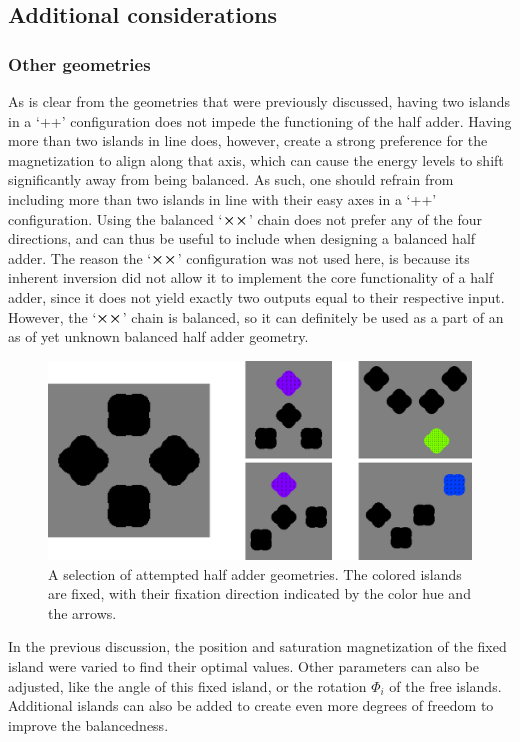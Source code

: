 \documentclass[11pt,a4paper,english,twoside]{article}
\begin{document}
\subsection{Additional considerations}
\subsubsection{Other geometries}
As is clear from the geometries that were previously discussed, having two islands in a `++' configuration does not impede the functioning of the half adder. Having more than two islands in line does, however, create a strong preference for the magnetization to align along that axis, which can cause the energy levels to shift significantly away from being balanced. As such, one should refrain from including more than two islands in line with their easy axes in a `++' configuration. Using the balanced `$\cross \cross$' chain does not prefer any of the four directions, and can thus be useful to include when designing a balanced half adder. The reason the `$\cross \cross$' configuration was not used here, is because its inherent inversion did not allow it to implement the core functionality of a half adder, since it does not yield exactly two outputs equal to their respective input. However, the `$\cross \cross$' chain is balanced, so it can definitely be used as a part of an as of yet unknown balanced half adder geometry. \par
\begin{figure}
    \centering
    \includegraphics[width=0.8\columnwidth]{Figures/half_adder/AllGeometries/collage.png}
    \caption{A selection of attempted half adder geometries. The colored islands are fixed, with their fixation direction indicated by the color hue and the arrows.}
    \label{fig:geometries}
\end{figure}
In the previous discussion, the position and saturation magnetization of the fixed island were varied to find their optimal values. Other parameters can also be adjusted, like the angle of this fixed island, or the rotation $\Phi_i$ of the free islands. Additional islands can also be added to create even more degrees of freedom to improve the balancedness. \par
\end{document}
